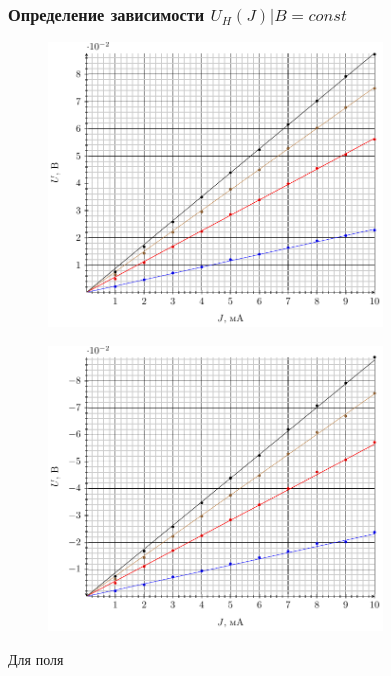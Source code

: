 

\subsubsection{Определение зависимости $U_{H}(J)|{B=const}$}
\begin{figure}[H]
	\centering
	\includegraphics[width=0.79\textwidth]{img/UHp}
	\caption{}
	\label{fig:uhp}
\end{figure}

\begin{figure}[H]
	\centering
	\includegraphics[width=0.79\textwidth]{img/UHm}
	\caption{}
	\label{fig:uhm}
\end{figure}

Для поля

